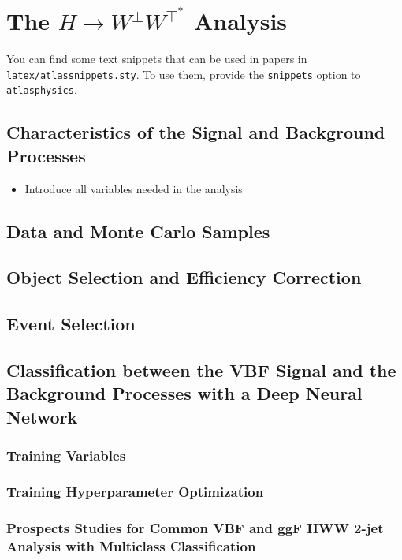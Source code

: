 \chapter{The $H\rightarrow W^{\pm}W^{\mp^*}$ Analysis}
\label{chap:hww}

You can find some text snippets that can be used in papers in \texttt{latex/atlassnippets.sty}.
To use them, provide the \texttt{snippets} option to \texttt{atlasphysics}.

\section{Characteristics of the Signal and Background Processes}
\begin{itemize}
    \item Introduce all variables needed in the analysis
\end{itemize}

\section{Data and Monte Carlo Samples}

\section{Object Selection and Efficiency Correction}

\section{Event Selection}

\section{Classification between the VBF Signal and the Background Processes with a Deep Neural Network}
\subsection{Training Variables}
\subsection{Training Hyperparameter Optimization}
\subsection{Prospects Studies for Common VBF and ggF HWW 2-jet Analysis with Multiclass Classification}

